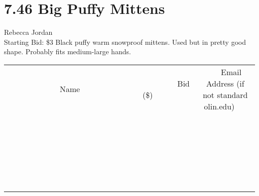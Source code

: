 \documentclass[11pt]{article}
\begin{document}
\section*{7.46 Big Puffy Mittens}
Rebecca Jordan
\\
Starting Bid: \$3
\newline
Black puffy warm snowproof mittens. Used but in pretty good shape. Probably fits medium-large hands.
\\[6ex]
\begin{tabular}{c c c}
~~~~~~~~~~~~~Name~~~~~~~~~~~~~ & ~~~~~~~~~Bid (\$)~~~~~~~~~  & ~~~Email Address (if not standard olin.edu)~~~\\
 & & \\
\hline
 & & \\
\hline
 & & \\
\hline
 & & \\
\hline
 & & \\
\hline
 & & \\
\hline
 & & \\
\hline
 & & \\
\hline
 & & \\
\hline
 & & \\
\hline
 & & \\
\hline
 & & \\
\hline
 & & \\
\hline
 & & \\
\hline
 & & \\
\hline
 & & \\
\hline
 & & \\
\hline
 & & \\
\hline
 & & \\
\hline
 & & \\
\hline
 & & \\
\hline
 & & \\
\hline
 & & \\
\hline
 & & \\
\hline
 & & \\
\hline
 & & \\
\hline
\end{tabular}
\newpage
\end{document}
